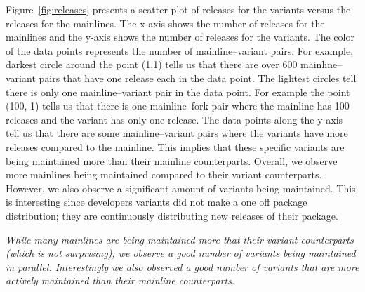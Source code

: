 Figure~\ref{fig:releases} presents a scatter plot of releases for the variants versus the releases for the mainlines. 
The x-axis shows the number of releases for the mainlines and the y-axis shows the number of releases for the variants. 
The color of the data points represents the number of mainline--variant pairs. For example, darkest circle around the point (1,1) tells us that there are over 600 mainline--variant pairs that have one release each in the data point. The lightest circles tell there is only one mainline--variant pair in the data point. For example the point (100, 1) tells us that there is one mainline--fork pair where the mainline has 100 releases and the variant has only one release.
The data points along the y-axis tell us that there are some mainline--variant pairs where the variants have more releases compared to the mainline. 
This implies that these specific variants are being maintained more than their mainline counterparts.
Overall, we observe more mainlines being maintained compared to their variant counterparts.
However, we also observe a significant amount of variants being maintained. 
This is interesting since developers variants did not make a one off package distribution; they are continuously distributing new releases of their package. 

\begin{framed}
\noindent
\emph{While many mainlines are being maintained more that their variant counterparts (which is not surprising), we observe a good number of variants being maintained in parallel. Interestingly we also observed a good number of variants that are more actively maintained than their mainline counterparts.}
\end{framed}

